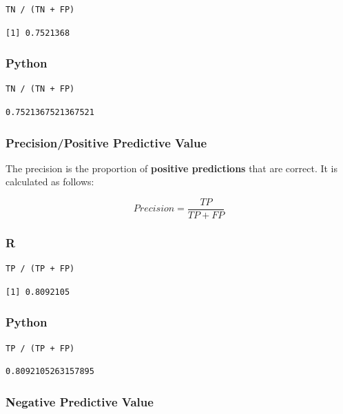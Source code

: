 \documentclass[
  letterpaper,
]{krantz}
\begin{document}
\begin{verbatim}
TN / (TN + FP)
\end{verbatim}

\begin{verbatim}
[1] 0.7521368
\end{verbatim}

\subsubsection{Python}

\begin{verbatim}
TN / (TN + FP)
\end{verbatim}

\begin{verbatim}
0.7521367521367521
\end{verbatim}

\subsubsection{Precision/Positive Predictive
Value}\label{sec-knowing-metrics-precision}

The precision is the proportion of \textbf{positive predictions} that
are correct. It is calculated as follows:

\[Precision = \frac{TP}{TP + FP}\]

\subsubsection{R}

\begin{verbatim}
TP / (TP + FP)
\end{verbatim}

\begin{verbatim}
[1] 0.8092105
\end{verbatim}

\subsubsection{Python}

\begin{verbatim}
TP / (TP + FP)
\end{verbatim}

\begin{verbatim}
0.8092105263157895
\end{verbatim}

\subsubsection{Negative Predictive Value}\label{sec-knowing-metrics-npv}
\end{document}
